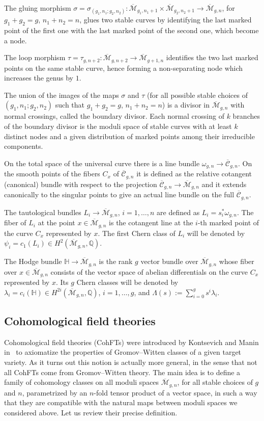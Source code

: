 \documentclass[pdftex]{sigma}
\numberwithin{equation}{section}
\newcommand{\oM}{\overline{\mathcal M}}
\def\mbQ{{\mathbb Q}}
\newcommand{\<}{\left<}
\renewcommand{\>}{\right>}
\begin{document}
The gluing morphism $\sigma=\sigma_{(g_1,n_1;g_2,n_2)}\colon \oM_{g_1,n_1+1}\times \oM_{g_2,n_2+1} \to \oM_{g,n}$, for $g_1+g_2=g$, $n_1+n_2=n$, glues two stable curves by identifying the last marked point of the f\/irst one with the last marked point of the second one, which become a node.

The loop morphism $\tau=\tau_{g,n+2}\colon \oM_{g,n+2}\to \oM_{g+1,n}$ identif\/ies the two last marked points on the same stable curve, hence forming a non-separating node which increases the genus by $1$.

The union of the images of the maps $\sigma$ and $\tau$ (for all possible stable choices of $(g_1,n_1;g_2,n_2)$ such that $g_1+g_2=g$, $n_1+n_2=n$) is a divisor in $\oM_{g,n}$ with normal crossings, called the boundary divisor. Each normal crossing of $k$ branches of the boundary divisor is the moduli space of stable curves with at least $k$ distinct nodes and a given distribution of marked points among their irreducible components.

On the total space of the universal curve there is a line bundle $\omega_{g,n} \to\overline{\mathcal{C}}_{g,n}$. On the smooth points of the f\/ibers $C_x$ of $\overline{\mathcal{C}}_{g,n}$ it is def\/ined as the relative cotangent (canonical) bundle with respect to the projection $\overline{\mathcal{C}}_{g,n}\to \oM_{g,n}$ and it extends canonically to the singular points to give an actual line bundle on the full $\overline{\mathcal{C}}_{g,n}$.

The tautological bundles $L_i \to \oM_{g,n}$, $i=1,\dots,n$ are def\/ined as $L_i = s_i^* \omega_{g,n}$. The f\/iber of $L_i$ at the point $x\in \oM_{g,n}$ is the cotangent line at the $i$-th marked point of the curve $C_x$ represented by $x$. The f\/irst Chern class of $L_i$ will be denoted by $\psi_i = c_1(L_i) \in H^2(\oM_{g,n},\mbQ)$.

The Hodge bundle $\mathbb{H}\to \oM_{g,n}$ is the rank $g$ vector bundle over $\oM_{g,n}$ whose f\/iber over $x\in \oM_{g,n}$ consists of the vector space of abelian dif\/ferentials on the curve $C_x$ represented by $x$. Its $g$ Chern classes will be denoted by $\lambda_i = c_i(\mathbb{H}) \in H^{2i}(\oM_{g,n},\mbQ)$, $i=1,\dots,g$, and $\Lambda(s) := \sum\limits_{i=0}^g s^i \lambda_i$.

\subsection{Cohomological field theories}\label{sect:CohFTs} Cohomological f\/ield theories (CohFTs) were introduced by Kontsevich and Manin in~\cite{KM94} to axiomatize the properties of Gromov--Witten classes of a given target variety. As it turns out this notion is actually more general, in the sense that not all CohFTs come from Gromov--Witten theory. The main idea is to def\/ine a family of cohomology classes on all moduli spaces $\oM_{g,n}$, for all stable choices of $g$ and $n$, parametrized by an $n$-fold tensor product of a vector space, in such a way that they are compatible with the natural maps between moduli spaces we considered above. Let us review their precise def\/inition.
\end{document}

